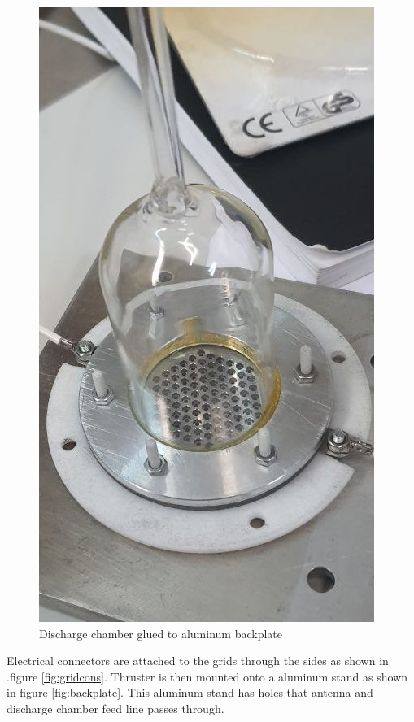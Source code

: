 \begin{figure}[ht]
    \centering
    \includegraphics[scale=.5]{fig/assm/al_glass.jpeg}
    \caption{Discharge chamber glued to aluminum backplate}
    \label{fig:glass_alum}
\end{figure}
\newpage
Electrical connectors are attached to the grids through the sides as shown in .figure \ref{fig:gridcons}. Thruster is then mounted onto a aluminum stand as shown in figure \ref{fig:backplate}. This aluminum stand has holes that antenna and discharge chamber feed line passes through.
\newpage
